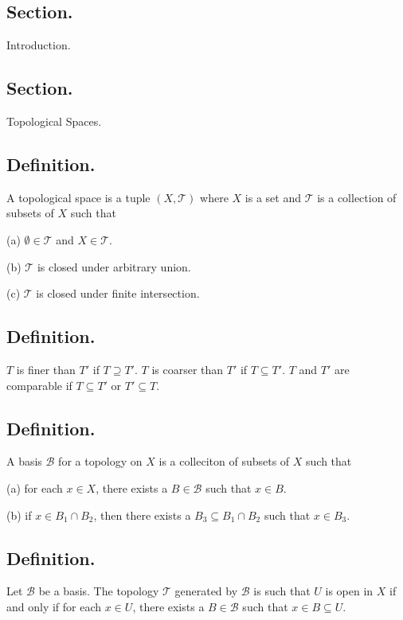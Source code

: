 \documentclass[titlepage]{article}
\begin{document}
\maketitle

\tableofcontents

\newpage {}

\subsection{Section.} Introduction.

\newpage {}

\subsection{Section.} Topological Spaces.

\subsection{Definition.} A topological space is a tuple $(X, \mathcal{T})$ where $X$ is a set and $\mathcal{T}$ is a collection of subsets of $X$ such that 

(a) $\emptyset \in \mathcal{T}$ and $X \in \mathcal{T}$.

(b) $\mathcal{T}$ is closed under arbitrary union.

(c) $\mathcal{T}$ is closed under finite intersection.

\subsection{Definition.} $T$ is finer than $T'$ if $T \supseteq T'$. $T$ is coarser than $T'$ if $T \subseteq T'$. $T$ and $T'$ are comparable if $T \subseteq T'$ or $T' \subseteq T$.

\subsection{Definition.} A basis $\mathcal{B}$ for a topology on $X$ is a colleciton of subsets of $X$ such that 

(a) for each $x \in X$, there exists a $B \in \mathcal{B}$ such that $x \in B$.

(b) if $x \in B_{1} \cap B_{2}$, then there exists a $B_{3} \subseteq B_{1} \cap B_{2}$ such that $x \in B_{3}$.

\subsection{Definition.} Let $\mathcal{B}$ be a basis. The topology $\mathcal{T}$ generated by $\mathcal{B}$ is such that $U$ is open in $X$ if and only if for each $x \in U$, there exists a $B \in \mathcal{B}$ such that $x \in B \subseteq U$.
\end{document}
